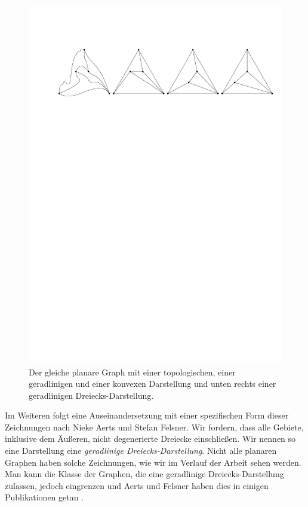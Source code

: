 \begin{figure}[h]
	\centering
  \includegraphics[width=1\textwidth]{topo_straight_convex.pdf}
	\caption{Der gleiche planare Graph mit einer topologischen, einer ge\-rad\-lini\-gen und einer konvexen Darstellung und unten rechts einer geradlinigen Dreiecks-Darstellung.}
	\label{topo_straight_convex}
\end{figure}

Im Weiteren folgt eine Auseinandersetzung mit einer spezifischen Form dieser Zeichnungen nach Nieke Aerts und Stefan Felsner. Wir fordern, dass alle Gebiete, inklusive dem Äußeren, nicht degenerierte Dreiecke einschließen. Wir nennen so eine Darstellung eine \textit{geradlinige Dreiecks-Darstellung}. Nicht alle planaren Graphen haben solche Zeichnungen, wie wir im Verlauf der Arbeit sehen werden. Man kann die Klasse der Graphen, die eine geradlinige Dreiecks-Darstellung zulassen, jedoch eingrenzen und Aerts und Felsner haben dies in einigen Publikationen getan \cite{af13h,af13,af15}.

